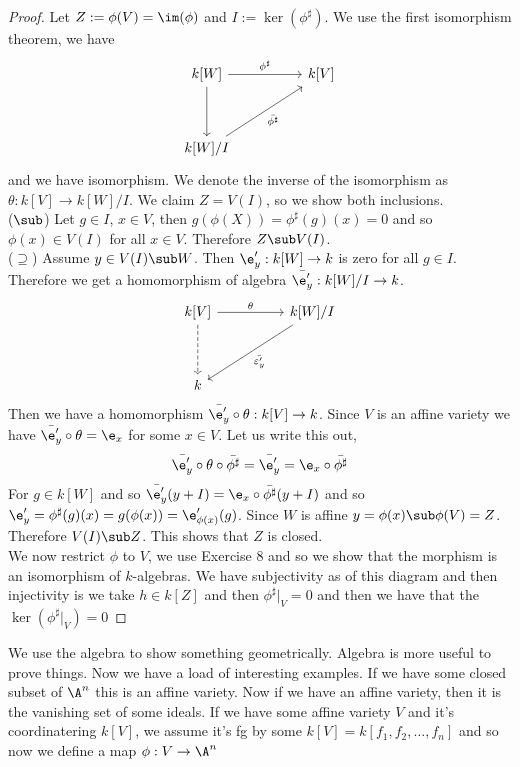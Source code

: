 \begin{proof}
  Let $Z := \phi(V) = \im (\phi)$ and $I := \ker(\phi^\sharp)$. We use the first isomorphism theorem, we have
  \[\begin{tikzcd}
	{k[W]} && {k[V]} \\
	\\
	{k[W]/I}
	\arrow["{\phi^\sharp}", from=1-1, to=1-3]
	\arrow["{\bar{\phi^\sharp}}"', from=3-1, to=1-3]
	\arrow[from=1-1, to=3-1]
\end{tikzcd}\]
and we have isomorphism. We denote the inverse of the isomorphism as $\theta : k[V] \to k[W]/I$. We claim $Z = V(I)$, so we show both inclusions.\\
($\sub$) Let $g \in I$, $x \in V$, then $g(\phi(X)) = \phi^\sharp (g)(x) = 0$ and so $\phi(x) \in V(I)$ for all $x \in V$. Therefore $Z \sub V(I)$.\\
($\supseteq$) Assume $y \in V(I) \sub W$. Then $\e'_y : k[W] \to k$ is zero for all $g \in I$. Therefore we get a homomorphism of algebra $\bar{\e'_y} : k[W]/I \to k$.
\[\begin{tikzcd}
	{k[V]} && {k[W]/I} \\
	\\
	k
	\arrow["\theta", from=1-1, to=1-3]
	\arrow["{\bar{\varepsilon'_y}}", from=1-3, to=3-1]
	\arrow[dashed, from=1-1, to=3-1]
\end{tikzcd}\]
Then we have a homomorphism $\bar{\e'_y} \circ \theta : k[V] \to k$. Since $V$ is an affine variety we have $\bar{\e'_y} \circ \theta = \e_x$ for some $x \in V$. Let us write this out,
$$ \bar{\e'_y} \circ \theta \circ \bar{\phi^\sharp} = \bar{\e'_{y}} = \e_x \circ \bar{\phi^\sharp} $$
For $g \in k[W]$ and so $\bar{\e'_y} (y + I) = \e_x \circ \bar{\phi^\sharp}(y + I)$ and so $\e'_y = \phi^\sharp (g)(x) = g(\phi(x)) = \e'_{\phi(x)}(g)$. Since $W$ is affine $y = \phi(x) \sub \phi(V) = Z$. Therefore $V(I) \sub Z$. This shows that $Z$ is closed.\\

\noindent
We now restrict $\phi$ to $V$, we use Exercise $8$ and so we show that the morphism is an isomorphism of $k$-algebras. We have subjectivity as of this diagram
and then injectivity is we take $h \in k[Z]$ and then $\phi^\sharp|_{V} = 0$ and then we have that the $\ker(\phi^\sharp|_V) = 0$
\end{proof}
We use the algebra to show something geometrically. Algebra is more useful to prove things. Now we have a load of interesting examples. If we have some closed subset of $\A^n$ this is an affine variety. Now if we have an affine variety, then it is the vanishing set of some ideals. If we have some affine variety $V$ and it's coordinatering $k[V]$, we assume it's fg by some $k[V] = k[f_1, f_2, \dots, f_n]$ and so now we define a map $\phi : V \to \A^n$
